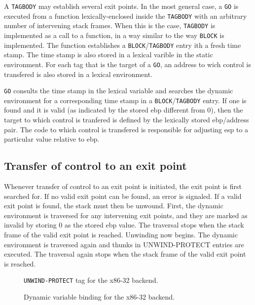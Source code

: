 A \texttt{TAGBODY} may establish several exit points.  In the most
general case, a \texttt{GO} is executed from a function
lexically-enclosed inside the \texttt{TAGBODY} with an arbitrary
number of intervening stack frames.  When this is the case,
\texttt{TAGBODY} is implemented as a call to a function, in a way
similar to the way \texttt{BLOCK} is implemented.  The function
establishes a \texttt{BLOCK}/\texttt{TAGBODY} entry ith a fresh time
stamp.  The time stamp is also stored in a lexical varible in the
static environment.  For each tag that is the target of a \texttt{GO},
an address to wich control is transfered is also stored in a lexical
environment.

\texttt{GO} consults the time stamp in the lexical variable and
searches the dynamic environment for a corresponding time stamp in a
\texttt{BLOCK}/\texttt{TAGBODY} entry.  If one is found and it is
valid (as indicated by the stored ebp different from 0), then the
target to which control is tranfered is defined by the lexically
stored ebp/address pair.  The code to which control is transfered is
responsible for adjusting esp to a particular value relative to ebp.

\subsection{Transfer of control to an exit point}

Whenever transfer of control to an exit point is initiated, the exit
point is first searched for.  If no valid exit point can be found, an
error is signaled.  If a valid exit point is found, the stack must
then be unwound.  First, the dynamic environment is traversed for any
intervening exit points, and they are marked as invalid by storing 0
as the stored ebp value.  The traversal stops when the stack frame of
the valid exit point is reached.  Unwinding now begins.  The dynamic
environment is traversed again and thunks in UNWIND-PROTECT entries
are executed.  The traversal again stops when the stack frame of the
valid exit point is reached.

\begin{figure}
\begin{center}
\end{center}
\caption{\label{fig-x86-32-unwind-protect}
\texttt{UNWIND-PROTECT} tag for the x86-32 backend.}
\end{figure}

\begin{figure}
\begin{center}
\end{center}
\caption{\label{fig-x86-32-dynamic-binding}
Dynamic variable binding for the x86-32 backend.}
\end{figure}

